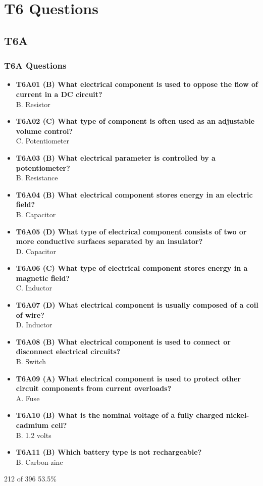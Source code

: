 \documentclass[10pt]{beamer}
\begin{document}
\section{T6 Questions}
\subsection{T6A}
\begin{frame}
\frametitle{T6A Questions}
\tiny
\begin{itemize}[<+->]
\item\textbf{T6A01 (B) What electrical component is used to oppose the flow of current in a DC circuit?}\\B. Resistor
\item\textbf{T6A02 (C) What type of component is often used as an adjustable volume control?}\\C. Potentiometer
\item\textbf{T6A03 (B) What electrical parameter is controlled by a potentiometer?}\\B. Resistance
\item\textbf{T6A04 (B) What electrical component stores energy in an electric field?}\\B. Capacitor
\item\textbf{T6A05 (D) What type of electrical component consists of two or more conductive surfaces separated by an insulator?}\\D. Capacitor
\item\textbf{T6A06 (C) What type of electrical component stores energy in a magnetic field?}\\C. Inductor
\item\textbf{T6A07 (D) What electrical component is usually composed of a coil of wire?}\\D. Inductor
\item\textbf{T6A08 (B) What electrical component is used to connect or disconnect electrical circuits?}\\B. Switch
\item\textbf{T6A09 (A) What electrical component is used to protect other circuit components from current overloads?}\\A. Fuse
\item\textbf{T6A10 (B) What is the nominal voltage of a fully charged nickel-cadmium cell?}\\B. 1.2 volts
\item\textbf{T6A11 (B) Which battery type is not rechargeable?}\\B. Carbon-zinc
\end{itemize}
\tiny 212 of 396  53.5\%
\end{frame}
\end{document}
